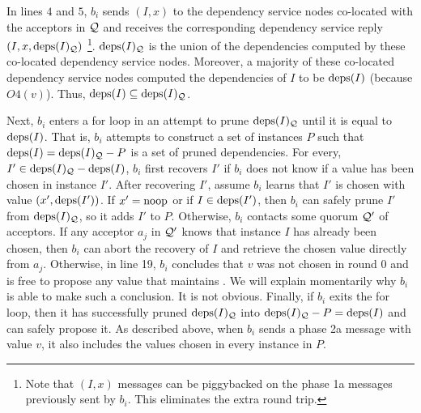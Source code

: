In lines $4$ and $5$, $b_i$ sends $(I, x)$ to the dependency service nodes
co-located with the acceptors in $\mathcal{Q}$ and receives the corresponding
dependency service reply $(I, x, \text{deps}(I)_{\mathcal{Q}})$%
\footnote{%
  Note that $(I, x)$ messages can be piggybacked on the phase 1a messages
  previously sent by $b_i$. This eliminates the extra round trip.
}.
$\text{deps}(I)_{\mathcal{Q}}$ is the union of the dependencies computed by these
co-located dependency service nodes. Moreover, a majority of these co-located
dependency service nodes computed the dependencies of $I$ to be $\text{deps}(I)$
(because $O4(v)$). Thus, $\text{deps}(I) \subseteq \text{deps}(I)_{\mathcal{Q}}$.

Next, $b_i$ enters a for loop in an attempt to prune $\text{deps}(I)_{\mathcal{Q}}$ until
it is equal to $\text{deps}(I)$. That is, $b_i$ attempts to construct a set of
instances $P$ such that $\text{deps}(I) = \text{deps}(I)_{\mathcal{Q}} - P$ is a set of pruned
dependencies. For every, $I' \in \text{deps}(I)_{\mathcal{Q}} - \text{deps}(I)$, $b_i$ first
recovers $I'$ if $b_i$ does not know if a value has been chosen in instance
$I'$. After recovering $I'$, assume $b_i$ learns that $I'$ is chosen with value
$(x', \text{deps}(I'))$. If $x' = \text{noop}$ or if $I \in \text{deps}(I')$, then $b_i$ can
safely prune $I'$ from $\text{deps}(I)_{\mathcal{Q}}$, so it adds $I'$ to $P$.
%
Otherwise, $b_i$ contacts some quorum $\mathcal{Q}'$ of acceptors. If any acceptor
$a_j$ in $\mathcal{Q}'$ knows that instance $I$ has already been chosen, then $b_i$
can abort the recovery of $I$ and retrieve the chosen value directly from
$a_j$. Otherwise, in line 19, $b_i$ concludes that $v$ was not chosen in round
$0$ and is free to propose any value that maintains
. We will explain momentarily why $b_i$ is able to
make such a conclusion. It is not obvious.
%
Finally, if $b_i$ exits the for loop, then it has successfully pruned
$\text{deps}(I)_{\mathcal{Q}}$ into $\text{deps}(I)_{\mathcal{Q}} - P = \text{deps}(I)$ and can safely
propose it. As described above, when $b_i$ sends a phase 2a message with value
$v$, it also includes the values chosen in every instance in $P$.

